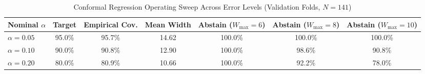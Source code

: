 \begin{table}[t]
\centering
\small
\caption{Conformal Regression Operating Sweep Across Error Levels (Validation Folds, $N=141$)}
\label{tab:conformal_regression_val}
\begin{tabular}{lcccccc}
\toprule
\textbf{Nominal $\alpha$} & \textbf{Target} & \textbf{Empirical Cov.} & \textbf{Mean Width} & \textbf{Abstain ($W_{\max}=6$)} & \textbf{Abstain ($W_{\max}=8$)} & \textbf{Abstain ($W_{\max}=10$)} \\
\midrule
$\alpha = 0.05$ & 95.0\% & 95.7\% & 14.62 & 100.0\% & 100.0\% & 100.0\% \\
$\alpha = 0.10$ & 90.0\% & 90.8\% & 12.90 & 100.0\% & 98.6\% & 90.8\% \\
$\alpha = 0.20$ & 80.0\% & 80.9\% & 10.66 & 100.0\% & 92.2\% & 78.0\% \\
\bottomrule
\end{tabular}
\end{table}
